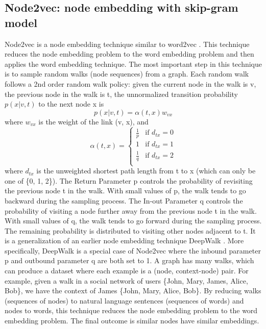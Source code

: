 \documentclass[12pt]{WSUThesis}
\theoremstyle{definition}
\begin{document}
\subsection{Node2vec: node embedding with skip-gram model}
Node2vec is a node embedding technique similar to word2vec \citep{grover2016node2vec}.
This technique reduces the node embedding problem to the word embedding problem and then applies the word embedding technique.
The most important step in this technique is to sample random walks (node sequences) from a graph.
Each random walk follows a 2nd order random walk policy: given the current node in the walk is v, the previous node in the walk is t, the unnormalized transition probability $ p(x | v, t) $ to the next node x is
\[ p(x | v, t) = \alpha(t, x) w_{vx} \]
where $ w_{vx} $ is the weight of the link (v, x), and
\begin{equation*}
\alpha(t, x) =
\begin{cases}
\frac{1}{p} &\text{if $d_{tx} = 0$}\\
1 &\text{if $d_{tx} = 1$}\\
\frac{1}{q} &\text{if $d_{tx} = 2$}\\
\end{cases}
\end{equation*}
where $ d_{tx} $ is the unweighted shortest path length from t to x (which can only be one of \{0, 1, 2\}).
The Return Parameter p controls the probability of revisiting the previous node t in the walk. With small values of p, the walk tends to go backward during the sampling process.
The In-out Parameter q controls the probability of visiting a node further away from the previous node t in the walk.
With small values of q, the walk tends to go forward during the sampling process.
The remaining probability is distributed to visiting other nodes adjacent to t.
It is a generalization of an earlier node embedding technique DeepWalk \citep{perozzi2014deepwalk}.
More specifically, DeepWalk is a special case of Node2vec where the inbound parameter p and outbound parameter q are both set to 1.
A graph has many walks, which can produce a dataset where each example is a (node, context-node) pair.
For example, given a walk in a social network of users \{John, Mary, James, Alice, Bob\}, we have the context of James \{John, Mary, Alice, Bob\}.
By reducing walks (sequences of nodes) to natural language sentences (sequences of words) and nodes to words,
this technique reduces the node embedding problem to the word embedding problem.
The final outcome is similar nodes have similar embeddings.
\end{document}
